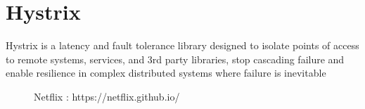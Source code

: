 \documentclass[9pt,twocolumn,twoside]{optica-suppl-materials}
\begin{document}
\section*{Hystrix}
Hystrix is a latency and fault tolerance library designed to isolate points of access to remote systems, services, and 3rd party libraries, stop cascading failure and enable resilience in complex distributed systems where failure is inevitable
\begin{figure}[htbp]
\centering
{}
\caption{Netflix : https://netflix.github.io/}
\label{fig:false-color}
\end{figure}
\end{document}
